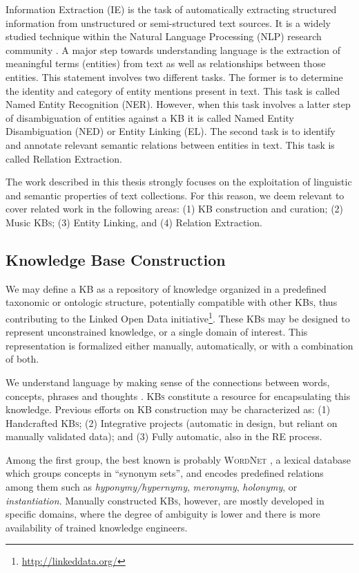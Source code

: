Information Extraction (IE) is the task of automatically extracting structured information from unstructured or semi-structured text sources. It is a widely studied technique within the Natural Language Processing (NLP) research community \cite{cowie1996information}.
A major step towards understanding language is the extraction of meaningful terms (entities) from text as well as relationships between those entities. This statement involves two different tasks. The former is to determine the identity and category of entity mentions present in text. This task is called Named Entity Recognition (NER). However, when this task involves a latter step of disambiguation of entities against a KB it is called Named Entity Disambiguation (NED) or Entity Linking (EL). The second task is to identify and annotate relevant semantic relations between entities in text. This task is called Rellation Extraction.

The work described in this thesis strongly focuses on the exploitation of linguistic and semantic properties of text collections. For this reason, we deem relevant to cover related work in the following areas: (1) \textsc{KB} construction and curation; (2) Music \textsc{KBs}; (3) Entity Linking, and (4) Relation Extraction.


\subsection{Knowledge Base Construction}
\label{sec:SOA:nlu:kbs}

We may define a \textsc{KB} as a repository of knowledge organized in a predefined taxonomic or ontologic structure, potentially compatible with other \textsc{KBs}, thus contributing to the Linked Open Data initiative\footnote{\url{http://linkeddata.org/}}. These \textsc{KBs} may be designed to represent unconstrained knowledge, or a single domain of interest. This representation is formalized either manually, automatically, or with a combination of both.

We understand language by making sense of the connections between words, concepts, phrases and thoughts \citep{Havasietal2007}. \textsc{KBs} constitute a resource for encapsulating this knowledge. Previous efforts on \textsc{KB} construction may be characterized as: (1) Handcrafted \textsc{KBs}; (2) Integrative projects (automatic in design, but reliant on manually validated data); and (3) Fully automatic, also in the \textsc{RE} process.

Among the first group, the best known is probably \textsc{WordNet} \citep{Miller1995}, a lexical database which groups concepts in ``synonym sets'', and encodes predefined relations among them such as \textit{hyponymy/hypernymy}, \textit{meronymy}, \textit{holonymy}, or \textit{instantiation}. Manually constructed \textsc{KBs}, however, are mostly developed in specific domains, where the degree of ambiguity is lower and there is more availability of trained knowledge engineers.

